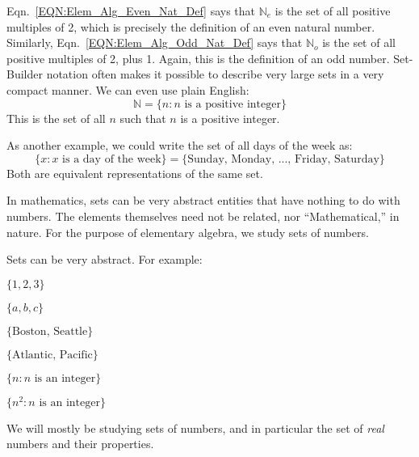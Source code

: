 \documentclass[crop=false,class=book,oneside]{standalone}
\begin{document}
            \par\hfill\par
            Eqn.~\ref{EQN:Elem_Alg_Even_Nat_Def} says that
            $\mathbb{N}_{e}$ is the set of all positive
            multiples of 2, which is precisely the
            definition of an even natural number.
            Similarly, Eqn.~\ref{EQN:Elem_Alg_Odd_Nat_Def}
            says that $\mathbb{N}_{o}$ is the set of all
            positive multiples of 2, plus 1. Again, this is
            the definition of an odd number. Set-Builder
            notation often makes it possible to describe
            very large sets in a very compact manner.
            We can even use plain English:
            \begin{equation}
                \mathbb{N}=
                \{n:n\textrm{ is a positive integer}\}
            \end{equation}
            This is the set of all $n$ such that $n$ is a
            positive integer.
            \begin{lexample}
                As another example, we could write
                the set of all days of the week as:
                \begin{equation}
                    \{x:x\textrm{ is a day of the week}\}
                    =\{\textrm{Sunday, Monday, ...,
                               Friday, Saturday}\}
                \end{equation}
                Both are equivalent representations of the
                same set.
            \end{lexample}
            In mathematics, sets can be very
            abstract entities that
            have nothing to do with numbers. The
            elements themselves need not be related,
            nor ``Mathematical,'' in nature.
            For the purpose of elementary algebra,
            we study sets of numbers.
            \begin{lexample}
                \label{ex:Elem_Alg_More_Examples_of_Sets}
                Sets can be very abstract. For example:
                \par\hfill\par
                \begin{enumerate}
                    \begin{multicols}{3}
                        \item $\{1,2,3\}$
                        \item $\{a,b,c\}$
                        \item $\{\textrm{Boston, Seattle}\}$
                        \item $\{\textrm{Atlantic, Pacific}\}$
                        \item $\{n:n\textrm{ is an integer}\}$
                        \item $\{n^2:n\textrm{ is an integer}\}$
                    \end{multicols}
                \end{enumerate}
                We will mostly be studying sets of numbers, and in particular
                the set of \textit{real} numbers and their properties.
            \end{lexample}
\end{document}
